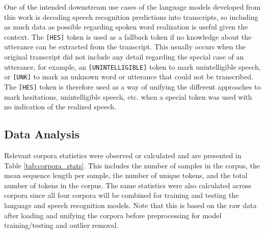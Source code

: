 \documentclass[12pt]{article}
\begin{document}
One of the intended downstream use cases of the language models developed from this work is decoding speech recognition predictions into transcripts,
so including as much data as possible regarding spoken word realization is useful given the context. The \lstinline|[HES]| token is used as a
fallback token if no knowledge about the utterance can be extracted from the transcript. This usually occurs when the original transcript did not
include any detail regarding the special case of an utterance, for example, an \lstinline|[UNINTELLIGIBLE]| token to mark unintelligible speech, or
\lstinline|[UNK]| to mark an unknown word or utterance that could not be transcribed. The \lstinline|[HES]| token is therefore used as a way of
unifying the different approaches to mark hesitations, unintelligible speech, etc. when a special token was used with no indication of the realized
speech.

\subsection{Data Analysis}\label{sec:data_analysis}
Relevant corpora statistics were observed or calculated and are presented in Table \ref{tab:corpora_stats}. This includes the number of samples in the
corpus, the mean sequence length per sample, the number of unique tokens, and the total number of tokens in the corpus. The same statistics were also
calculated across corpora since all four corpora will be combined for training and testing the language and speech recognition models. Note that this
is based on the raw data after loading and unifying the corpora before preprocessing for model training/testing and outlier removal.
\end{document}
